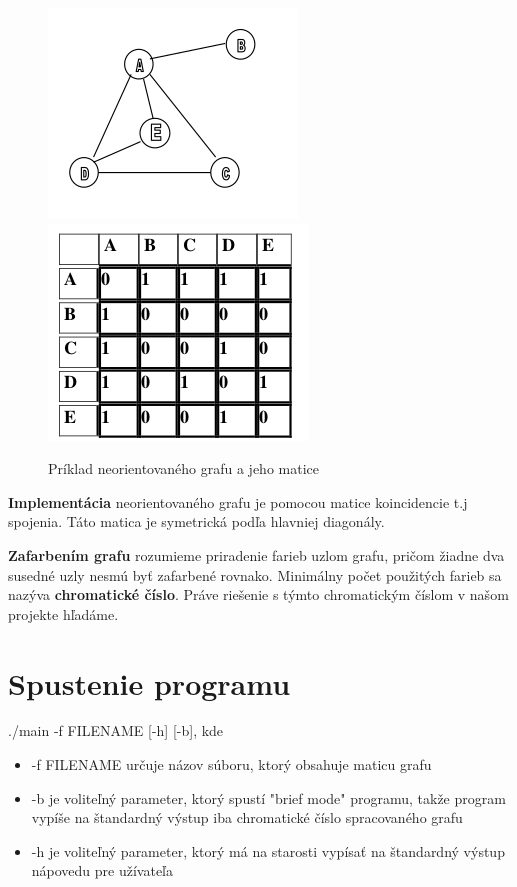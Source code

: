 \documentclass[a4paper,11pt]{article}
\begin{document}
\begin{figure}[h]
  \centering
  \includegraphics[scale=0.60]{neor_graf.png}\includegraphics[scale=0.58]{matrix_n_graf.png}
  \caption{Príklad neorientovaného grafu a jeho matice}
  \label{fig:graf}
\end{figure}

\textbf{Implementácia} neorientovaného grafu je pomocou matice koincidencie t.j spojenia. Táto matica je symetrická podľa hlavniej diagonály.

\textbf{Zafarbením grafu} rozumieme priradenie farieb uzlom grafu, pričom žiadne dva susedné uzly nesmú byť zafarbené rovnako. Minimálny počet použitých farieb sa nazýva \textbf{chromatické číslo}. Práve riešenie s týmto chromatickým číslom v našom projekte hľadáme. 
\newpage

\section{Spustenie programu}
./main -f FILENAME [-h] [-b], kde
\begin{itemize}
    \item -f FILENAME určuje názov súboru, ktorý obsahuje maticu grafu
    \item -b je voliteľný parameter,  ktorý spustí "brief mode" programu, takže program vypíše na štandardný výstup iba chromatické číslo spracovaného grafu
    \item -h je voliteľný parameter, ktorý má na starosti vypísať  na štandardný výstup nápovedu pre užívateľa
\end{itemize}
\end{document}
